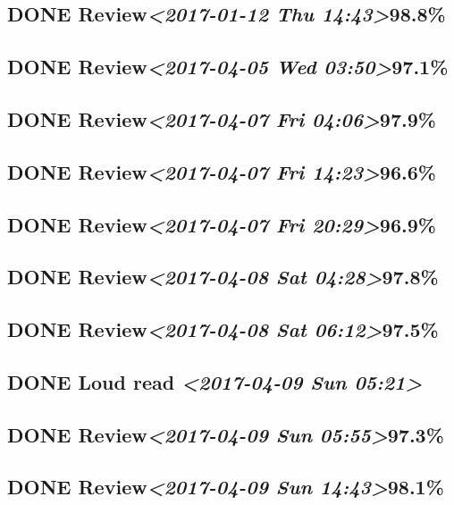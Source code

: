 \documentclass[11pt]{ctexart}
\begin{document}
\subsection{{\bfseries\sffamily DONE} Review\textit{<2017-01-12 Thu 14:43>}98.8\%}
\label{sec:org3423592}
\subsection{{\bfseries\sffamily DONE} Review\textit{<2017-04-05 Wed 03:50>}97.1\%}
\label{sec:orgc9d1fab}
\subsection{{\bfseries\sffamily DONE} Review\textit{<2017-04-07 Fri 04:06>}97.9\%}
\label{sec:org769e520}
\subsection{{\bfseries\sffamily DONE} Review\textit{<2017-04-07 Fri 14:23>}96.6\%}
\label{sec:orga3621eb}
\subsection{{\bfseries\sffamily DONE} Review\textit{<2017-04-07 Fri 20:29>}96.9\%}
\label{sec:orge8555a2}
\subsection{{\bfseries\sffamily DONE} Review\textit{<2017-04-08 Sat 04:28>}97.8\%}
\label{sec:org6a7f023}
\subsection{{\bfseries\sffamily DONE} Review\textit{<2017-04-08 Sat 06:12>}97.5\%}
\label{sec:orge3fdbc0}
\subsection{{\bfseries\sffamily DONE} Loud read \textit{<2017-04-09 Sun 05:21>}}
\label{sec:org102c91f}
\subsection{{\bfseries\sffamily DONE} Review\textit{<2017-04-09 Sun 05:55>}97.3\%}
\label{sec:org339d2d3}
\subsection{{\bfseries\sffamily DONE} Review\textit{<2017-04-09 Sun 14:43>}98.1\%}
\label{sec:org6a68f1c}
\end{document}
